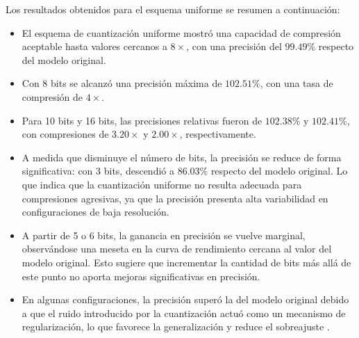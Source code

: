 
\vspace{-0.3cm}

Los resultados obtenidos para el esquema uniforme se resumen a continuación:

\begin{itemize}

\item El esquema de cuantización uniforme mostró una capacidad de compresión aceptable hasta valores cercanos a $8\times$, con una precisión del $99.49\%$ respecto del modelo original.

\item Con 8 bits se alcanzó una precisión máxima de $102.51\%$, con una tasa de compresión de $4\times$.

\item Para 10 bits y 16 bits, las precisiones relativas fueron de $102.38\%$ y $102.41\%$, con compresiones de $3.20\times$ y $2.00\times$, respectivamente.

\item A medida que disminuye el número de bits, la precisión se reduce de forma significativa: con 3 bits, descendió a $86.03\%$ respecto del modelo original. Lo que indica que la cuantización uniforme no resulta adecuada para compresiones agresivas, ya que la precisión presenta alta variabilidad en configuraciones de baja resolución.

\item A partir de 5 o 6 bits, la ganancia en precisión se vuelve marginal, observándose una meseta en la curva de rendimiento cercana al valor del modelo original. Esto sugiere que incrementar la cantidad de bits más allá de este punto no aporta mejoras significativas en precisión.

\item En algunas configuraciones, la precisión superó la del modelo original debido a que el ruido introducido por la cuantización actuó como un mecanismo de regularización, lo que favorece la generalización y reduce el sobreajuste \cite{Choi2019} \cite{banner2019posttraining4bitquantizationconvolution}.
\end{itemize}


